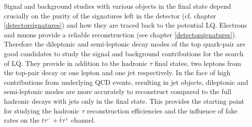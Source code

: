 Signal and background studies with various objects in the final state depend crucially on the purity of the signatures left in the detector (cf. chapter \ref{detectorsignatures}) and how they are traced back to the potential LQ. Electrons and muons provide a reliable reconstruction (see chapter \ref{detectorsignatures}). Therefore the dileptonic and semi-leptonic decay modes of the top quark-pair are good candidates to study the signal and background contributions for the search of LQ. They provide in addition to the hadronic $\tau$ final states, two leptons from the top-pair decay or one lepton and one jet respectively. In the face of high contributions from underlying QCD events, resulting in jet objects, dileptonic and semi-leptonic modes are more accurately to reconstruct compared to the full hadronic decays with jets only in the final state. This provides the starting point for studying the hadronic $\tau$ reconstruction efficiencies and the influence of fake rates on the $t\tau^{-}+\bar{t}\tau^{+}$ channel.
%
